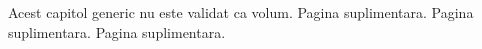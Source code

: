 \documentclass[a4paper,12pt]{report}
\begin{document}
Acest capitol generic nu este validat ca volum.
\newpage
Pagina suplimentara.
\newpage
Pagina suplimentara.
\newpage
Pagina suplimentara.
\end{document}
